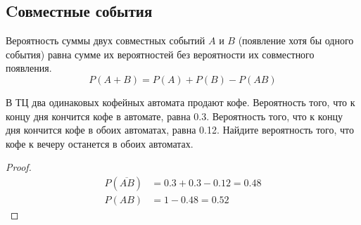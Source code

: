 \documentclass[a4paper,12pt]{extarticle}
\begin{document}
\subsection{Cовместные события}


\begin{theorem}
	Вероятность суммы двух совместных событий $A$ и $B$ (появление хотя бы одного события) равна сумме их вероятностей без вероятности их совместного появления.
	$$P(A+B)=P(A)+P(B)-P(AB)$$
\end{theorem}

\begin{problem}
	В ТЦ два одинаковых кофейных автомата продают кофе. Вероятность того, что к концу дня кончится кофе в автомате, равна 0.3.  Вероятность того, что к концу дня кончится кофе в обоих автоматах, равна 0.12. Найдите вероятность того, что кофе к вечеру останется в обоих автоматах.
\end{problem}
\begin{proof}
	\begin{align*}
	P(\overline{AB})&=0.3+0.3-0.12=0.48\\
	P(AB) &= 1-0.48=0.52    
	\end{align*}
\end{proof}
\end{document}
